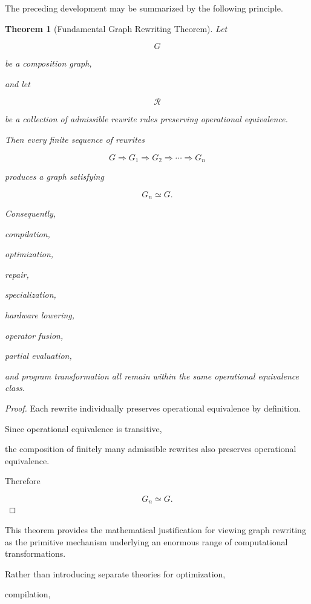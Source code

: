 \documentclass[12pt,oneside]{article}
\newtheorem{theorem}[definition]{Theorem}
\begin{document}
The preceding development may be summarized by the following principle.

\begin{theorem}[Fundamental Graph Rewriting Theorem]

Let

\[
G
\]

be a composition graph,

and let

\[
\mathcal R
\]

be a collection of admissible rewrite rules preserving operational equivalence.

Then every finite sequence of rewrites

\[
G
\Longrightarrow
G_1
\Longrightarrow
G_2
\Longrightarrow
\cdots
\Longrightarrow
G_n
\]

produces a graph satisfying

\[
G_n
\simeq
G.
\]

Consequently,

compilation,

optimization,

repair,

specialization,

hardware lowering,

operator fusion,

partial evaluation,

and program transformation all remain within the same operational equivalence class.

\end{theorem}

\begin{proof}

Each rewrite individually preserves operational equivalence by definition.

Since operational equivalence is transitive,

the composition of finitely many admissible rewrites also preserves operational equivalence.

Therefore

\[
G_n
\simeq
G.
\]

\end{proof}

This theorem provides the mathematical justification for viewing graph rewriting as the primitive mechanism underlying an enormous range of computational transformations.

Rather than introducing separate theories for optimization,

compilation,
\end{document}
